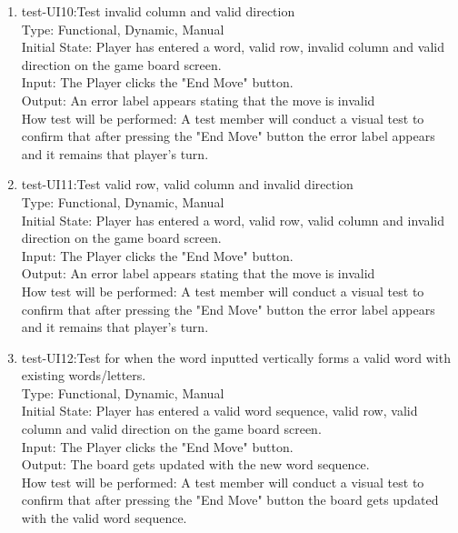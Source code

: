 \documentclass[12pt, titlepage]{article}
\begin{document}
\begin{enumerate}
    \item{test-UI10:Test invalid column and valid direction\\} %
    Type: Functional, Dynamic, Manual\\
    Initial State: Player has entered a word, valid row, invalid column and valid direction on the game board screen.\\
    Input: The Player clicks the "End Move" button.\\
    Output: An error label appears stating that the move is invalid \\
    How test will be performed: A test member will conduct a visual test to confirm that after pressing the "End Move" button the error label appears and it remains that player's turn.\\
    
    \item{test-UI11:Test valid row, valid column and invalid direction\\} %
    Type: Functional, Dynamic, Manual\\
    Initial State: Player has entered a word, valid row, valid column and invalid direction on the game board screen.\\
    Input: The Player clicks the "End Move" button.\\
    Output: An error label appears stating that the move is invalid \\
    How test will be performed: A test member will conduct a visual test to confirm that after pressing the "End Move" button the error label appears and it remains that player's turn.\\
    
    \item{test-UI12:Test for when the word inputted vertically forms a valid word with existing words/letters.\\} %
    Type: Functional, Dynamic, Manual\\
    Initial State: Player has entered a valid word sequence, valid row, valid column and valid direction on the game board screen.\\
    Input: The Player clicks the "End Move" button.\\
    Output: The board gets updated with the new word sequence. \\
    How test will be performed: A test member will conduct a visual test to confirm that after pressing the "End Move" button the board gets updated with the valid word sequence.\\
    

\end{enumerate}
\end{document}
